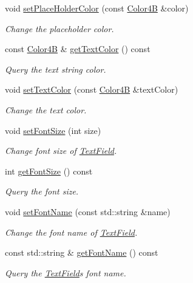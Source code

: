 \begin{DoxyCompactItemize}
void \hyperlink{classui_1_1TextField_acfd23c7de3ad8725aedac1f770230283}{set\+Place\+Holder\+Color} (const \hyperlink{structColor4B}{Color4B} \&color)
\begin{DoxyCompactList}\small\item\em Change the placeholder color. \end{DoxyCompactList}\item 
const \hyperlink{structColor4B}{Color4B} \& \hyperlink{classui_1_1TextField_a364cbb46e77eec715bd6fdfb05c428d6}{get\+Text\+Color} () const
\begin{DoxyCompactList}\small\item\em Query the text string color. \end{DoxyCompactList}\item 
void \hyperlink{classui_1_1TextField_a9eb575bdd0cfb182d591b90b8aab7b68}{set\+Text\+Color} (const \hyperlink{structColor4B}{Color4B} \&text\+Color)
\begin{DoxyCompactList}\small\item\em Change the text color. \end{DoxyCompactList}\item 
void \hyperlink{classui_1_1TextField_afeac699e913b7fad0d171745c98f0915}{set\+Font\+Size} (int size)
\begin{DoxyCompactList}\small\item\em Change font size of \hyperlink{classui_1_1TextField}{Text\+Field}. \end{DoxyCompactList}\item 
int \hyperlink{classui_1_1TextField_a92c02fd871c8c39af214b6796278f09e}{get\+Font\+Size} () const
\begin{DoxyCompactList}\small\item\em Query the font size. \end{DoxyCompactList}\item 
void \hyperlink{classui_1_1TextField_a0dc06b592621a2867e5e91cea01470db}{set\+Font\+Name} (const std\+::string \&name)
\begin{DoxyCompactList}\small\item\em Change the font name of \hyperlink{classui_1_1TextField}{Text\+Field}. \end{DoxyCompactList}\item 
const std\+::string \& \hyperlink{classui_1_1TextField_ae02879ddcc02e9d259509db2ba8c61f8}{get\+Font\+Name} () const
\begin{DoxyCompactList}\small\item\em Query the \hyperlink{classui_1_1TextField}{Text\+Field}\textquotesingle{}s font name. \end{DoxyCompactList}\item 

\end{DoxyCompactItemize}
